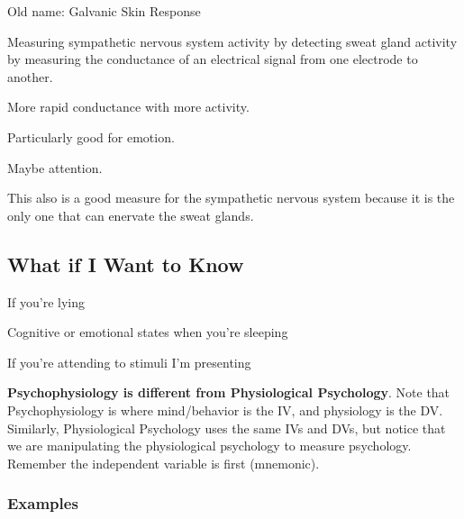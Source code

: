 \begin{coloredlist}
    \item {}
    \begin{coloredlist}
        \item Old name: Galvanic Skin Response
        \item Measuring sympathetic nervous system activity by detecting sweat gland activity by measuring the conductance of an electrical signal from one electrode to another.
        \item More rapid conductance with more activity.
        \item Particularly good for emotion.
        \item Maybe attention.
        \item This also is a good measure for the sympathetic nervous system because it is the only one that can enervate the sweat glands.
    \end{coloredlist}
\end{coloredlist}

\subsection{What if I Want to Know}

\begin{coloredlist}
    \item If you're lying
    \item Cognitive or emotional states when you're sleeping
    \item If you're attending to stimuli I'm presenting
\end{coloredlist}

\textbf{Psychophysiology is different from Physiological Psychology}. Note that Psychophysiology is where mind/behavior is the IV, and physiology is the DV. Similarly, Physiological Psychology uses the same IVs and DVs, but notice that we are manipulating the physiological psychology to measure psychology. Remember the independent variable is first (mnemonic). \\

\subsubsection{Examples}

